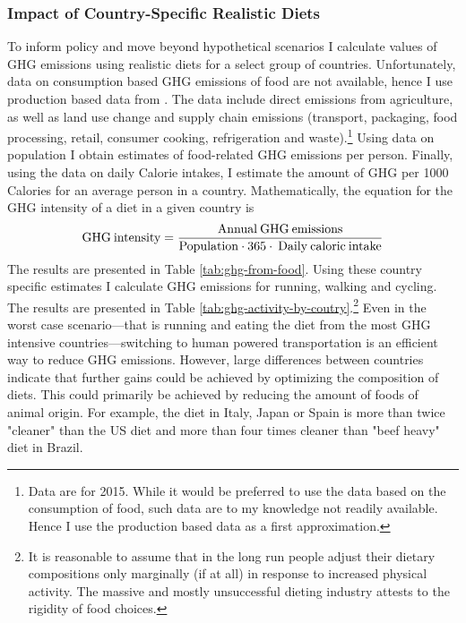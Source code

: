 \documentclass{article}[12pt,letterpaper]
\begin{document}
\subsubsection{Impact of Country-Specific Realistic Diets}
To inform policy and move beyond hypothetical scenarios I calculate values of GHG emissions using realistic diets for a select group of countries. Unfortunately, data on consumption based GHG emissions of food are not available, hence I use production based data from \citet{Crippa2021}. The data include direct emissions from agriculture, as well as land use change and supply chain emissions (transport, packaging, food processing, retail, consumer cooking, refrigeration and waste).\footnote{Data are for 2015. While it would be preferred to use the data based on the consumption of food, such data are to my knowledge not readily available. Hence I use the production based data as a first approximation.}
Using data on population I obtain estimates of food-related GHG emissions per person. Finally, using the data on daily Calorie intakes, I estimate the amount of GHG per 1000 Calories for an average person in a country. 
Mathematically, the equation for the GHG intensity of a diet in a given country is
\begin{equation}
    \rm GHG \: intensity = {\rm Annual \: GHG \: emissions \over Population \cdot 365 \cdot \: Daily \: caloric \: intake}
\end{equation}
The results are presented in Table \ref{tab:ghg-from-food}.
Using these country specific estimates I calculate GHG emissions for running, walking and cycling. The results are presented in Table \ref{tab:ghg-activity-by-coutry}.\footnote{It is reasonable to assume that in the long run people adjust their dietary compositions only marginally (if at all) in response to increased physical activity. The massive and mostly unsuccessful dieting industry attests to the rigidity of food choices.}
Even in the worst case scenario---that is running and eating the diet from the most GHG intensive countries---switching to human powered transportation is an efficient way to reduce GHG emissions. However, large differences between countries indicate that further gains could be achieved by optimizing the composition of diets. This could primarily be achieved by reducing the amount of foods of animal origin. For example, the diet in Italy, Japan or Spain is more than twice "cleaner" than the US diet and more than four times cleaner than "beef heavy" diet in Brazil.
\end{document}
